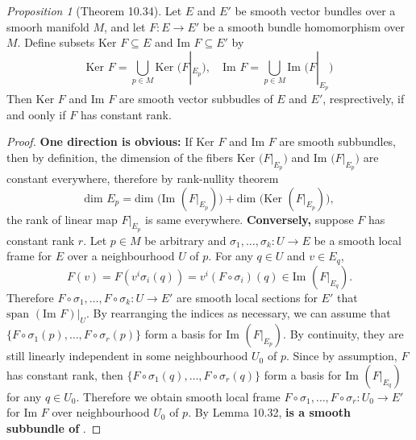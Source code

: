 \documentclass[a4paper]{article}
\theoremstyle{remark}
\newtheorem{prop}{Proposition}
\newcommand{\subhim}{\subseteq} %
\begin{document}
\begin{prop}[Theorem 10.34]
Let $E$ and $E'$ be smooth vector bundles over a smoorh manifold $M$, and let $F : E \to E'$ be a smooth bundle homomorphism over $M$. Define subsets $\text{Ker }F \subhim E$ and $\text{Im }F \subhim E'$ by
$$
\text{Ker }F =\bigcup_{p \in M} \text{Ker }\big(F|_{E_p}\big), \quad \text{Im }F = \bigcup_{p \in M} \text{Im } \big(F|_{E_p}\big) 
$$
Then $\text{Ker }F$ and $\text{Im }F$ are smooth vector subbudles of $E$ and $E'$, resprectively, if and oonly if $F$ has constant rank.
\end{prop}
\begin{proof}
\textbf{One direction is obvious:} If  $\text{Ker }F$ and $\text{Im }F$ are smooth subbundles, then by definition, the dimension of the fibers $ \text{Ker }\big(F|_{E_p}\big)$ and $\text{Im } \big(F|_{E_p}\big) $ are constant everywhere, therefore by rank-nullity theorem $$\text{dim }E_p = \text{dim }\big(\text{Im }(F|_{E_p}) \big)+ \text{dim }\big(\text{Ker }(F|_{E_p})\big),$$ the rank of linear map $F|_{E_p}$ is same everywhere. \textbf{Conversely,} suppose $F$ has constant rank $r$. Let $p \in M$ be arbitrary and $\sigma_1,\dots,\sigma_k : U \to E$ be a smooth local frame for $E$ over a neighbourhood $U$ of $p$.  For any $q \in U$ and $v \in E_q$,
$$
F(v) = F(v^i \sigma_i(q)) = v^i (F \circ \sigma_i)(q) \in \text{Im }(F|_{E_q}).
$$
Therefore $F \circ \sigma_1,\dots,F \circ \sigma_k : U \to E'$ are smooth local sections for $E'$ that $\text{span }(\text{Im }F)|_U$. By rearranging the indices as necessary, we can assume that $\{F \circ \sigma_1 (p), \dots, F \circ \sigma_r(p)\}$ form a basis for $\text{Im }(F|_{E_p})$. By continuity, they are still linearly independent in some neighbourhood $U_0$ of $p$. Since by assumption, $F$ has constant rank, then $\{F \circ \sigma_1 (q), \dots, F \circ \sigma_r(q)\}$ form a basis for $\text{Im }(F|_{E_q})$ for any $q \in U_0$. Therefore we obtain smooth local frame $F \circ \sigma_1,\dots,F\circ \sigma_r : U_0 \to E'$ for $\text{Im }F$ over neighbourhood $U_0$ of $p$. By Lemma 10.32, \textbf{ is a smooth subbundle of }.


\end{proof}
\end{document}
